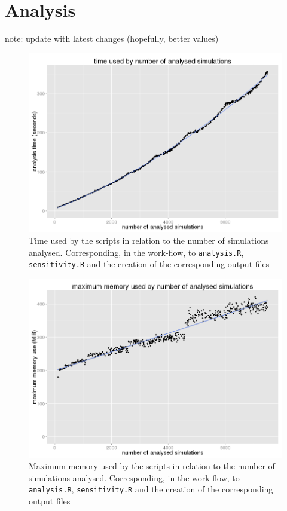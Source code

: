 \documentclass[a4paper,12pt]{report}
\begin{document}
\section{Analysis}
note: update with latest changes (hopefully, better values)
\begin{figure}[!htbp]
	\centering
	\includegraphics[scale=0.39]{../data/analysis-timeByNSimulations.png}
	\caption{Time used by the scripts in relation to the number of simulations analysed. Corresponding, in the work-flow, to \texttt{analysis.R}, \texttt{sensitivity.R} and the creation of the corresponding output files}
	\label{app:bench-analysis-time}
\end{figure}

\begin{figure}[!htbp]
	\centering
	\includegraphics[scale=0.39]{../data/analysis-maxMemByNSimulations.png}
	\caption{Maximum memory used by the scripts in relation to the number of simulations analysed. Corresponding, in the work-flow, to \texttt{analysis.R}, \texttt{sensitivity.R} and the creation of the corresponding output files}
	\label{app:bench-analysis-mem}
\end{figure}

\end{document}
